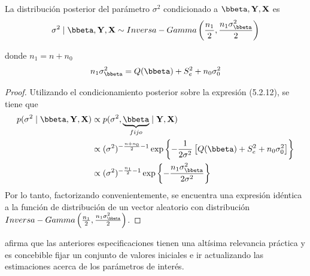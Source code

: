 \begin{Res}
La distribución posterior del parámetro $\sigma^2$ condicionado a $\bbeta,\mathbf{Y},\mathbf{X}$ es
\begin{equation*}
\sigma^2 \mid \bbeta,\mathbf{Y},\mathbf{X} \sim Inversa-Gamma\left( \frac{n_1}{2}, \frac{n_1\sigma_{\bbeta}^2}{2}  \right)
\end{equation*}

donde $n_1=n+n_0$
\begin{align*}
n_1\sigma_{\bbeta}^2=Q(\bbeta)+S^2_e+n_0\sigma^2_0
\end{align*}
\end{Res}

\begin{proof}
Utilizando el condicionamiento posterior sobre la expresión (5.2.12), se tiene que
\begin{align*}
p(\sigma^2 \mid \bbeta,\mathbf{Y},\mathbf{X})&\propto
p(\sigma^2,\underbrace{\bbeta}_{fijo} \mid \mathbf{Y},\mathbf{X})\\
&\propto(\sigma^2)^{-\frac{n+n_0}{2}-1}
\exp\left\{-\frac{1}{2\sigma^2}\left[Q(\bbeta)+S^2_e+n_0\sigma^2_0\right]\right\}\\
&\propto(\sigma^2)^{-\frac{n_1}{2}-1}
\exp\left\{-\frac{n_1\sigma_{\bbeta}^2}{2\sigma^2}\right\}
\end{align*}
Por lo tanto, factorizando convenientemente, se encuentra una expresión idéntica a la función de distribución de un vector aleatorio con distribución $Inversa-Gamma\left( \frac{n_1}{2}, \frac{n_1\sigma_{\bbeta}^2}{2}  \right)$.
\end{proof}

 afirma que las anteriores especificaciones tienen una altísima relevancia práctica y es concebible fijar un conjunto de valores iniciales e ir actualizando las estimaciones acerca de los parámetros de interés.

